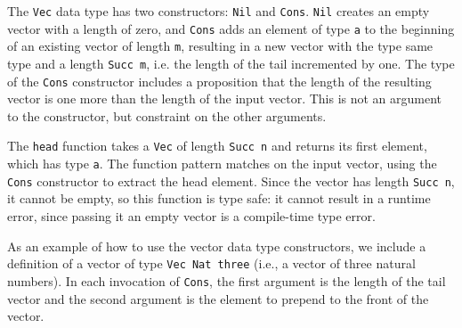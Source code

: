 The \texttt{Vec} data type has two constructors: \texttt{Nil} and \texttt{Cons}. 
\texttt{Nil} creates an empty vector with a length of zero, and \texttt{Cons}
adds an element of type \texttt{a} to the beginning of an existing vector of
length \texttt{m}, resulting in a new vector with the type same type and a
length \texttt{Succ m}, i.e. the length of the tail incremented by one. 
The type of the \texttt{Cons} constructor includes a proposition that the length of
the resulting vector is one more than the length of the input vector. This is
not an argument to the constructor, but constraint on the other arguments.

The \texttt{head} function takes a \texttt{Vec} of length \texttt{Succ n} and
returns its first element, which has type \texttt{a}. 
The function pattern matches on the input vector, using the \texttt{Cons} constructor to extract the head element.
Since the vector has length \texttt{Succ n}, it cannot be empty, so this
function is type safe: it cannot result in a runtime error, since passing it an
empty vector is a compile-time type error.

As an example of how to use the vector data type constructors, we include a
definition of a vector of type \texttt{Vec Nat three} (i.e., a vector of
three natural numbers). In each invocation of \texttt{Cons}, the first argument
is the length of the tail vector and the second argument is the element to
prepend to the front of the vector.

